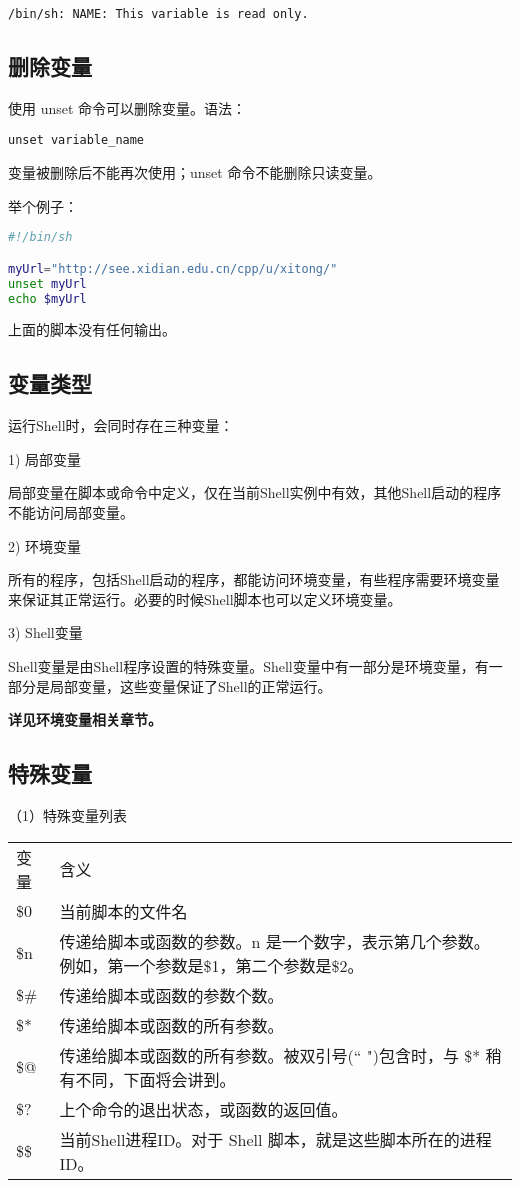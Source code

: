 \verb|/bin/sh: NAME: This variable is read only.|


\subsection{删除变量}
使用 unset 命令可以删除变量。语法：

\verb|unset variable_name|

变量被删除后不能再次使用；unset 命令不能删除只读变量。

举个例子：
\begin{lstlisting}[language=sh]
#!/bin/sh

myUrl="http://see.xidian.edu.cn/cpp/u/xitong/"
unset myUrl
echo $myUrl
\end{lstlisting}
上面的脚本没有任何输出。


\subsection{变量类型}
运行Shell时，会同时存在三种变量：

1) 局部变量

局部变量在脚本或命令中定义，仅在当前Shell实例中有效，其他Shell启动的程序不能访问局部变量。

2) 环境变量

所有的程序，包括Shell启动的程序，都能访问环境变量，有些程序需要环境变量来保证其正常运行。必要的时候Shell脚本也可以定义环境变量。

3) Shell变量

Shell变量是由Shell程序设置的特殊变量。Shell变量中有一部分是环境变量，有一部分是局部变量，这些变量保证了Shell的正常运行。

\textbf{详见环境变量相关章节。}


\subsection{特殊变量}
（1）特殊变量列表

\begin{center}
{\small
\begin{tabular}{l|l}
变量&含义\\
\$0 &当前脚本的文件名\\
\$n	&传递给脚本或函数的参数。n 是一个数字，表示第几个参数。例如，第一个参数是\$1，第二个参数是\$2。\\
\$\#&	传递给脚本或函数的参数个数。\\
\$*	&传递给脚本或函数的所有参数。\\
\$@ &	传递给脚本或函数的所有参数。被双引号(`` ")包含时，与 \$* 稍有不同，下面将会讲到。\\
\$?	&上个命令的退出状态，或函数的返回值。\\
\$\$&	当前Shell进程ID。对于 Shell 脚本，就是这些脚本所在的进程ID。\\
\end{tabular}
}
\end{center}

